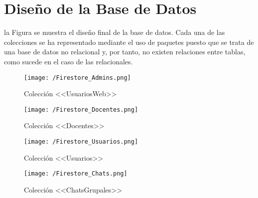 \chapter{Diseño de la Base de Datos}
\label{chap:bbdd}
 la Figura se muestra el diseño final de la base de datos. Cada una de las colecciones se ha representado mediante el uso de paquetes puesto que se trata de una base de datos no relacional y, por tanto, no existen relaciones entre tablas, como sucede en el caso de las relacionales.

\begin{figure}[!h]
	\begin{center}
		\texttt{[image: /Firestore\_Admins.png]}
		\caption{Colección <<UsuariosWeb>>}
		\label{fig:bbddadmins}
	\end{center}
\end{figure}

\begin{figure}[!h]
	\begin{center}
		\texttt{[image: /Firestore\_Docentes.png]}
		\caption{Colección <<Docentes>>}
		\label{fig:bbdddocentes}
	\end{center}
\end{figure}

\begin{figure}[!h]
	\begin{center}
		\texttt{[image: /Firestore\_Usuarios.png]}
		\caption{Colección <<Usuarios>>}
		\label{fig:bbddusuarios}
	\end{center}
\end{figure}

\begin{figure}[!h]
	\begin{center}
		\texttt{[image: /Firestore\_Chats.png]}
		\caption{Colección <<ChatsGrupales>>}
		\label{fig:bbddchats}
	\end{center}
\end{figure}


